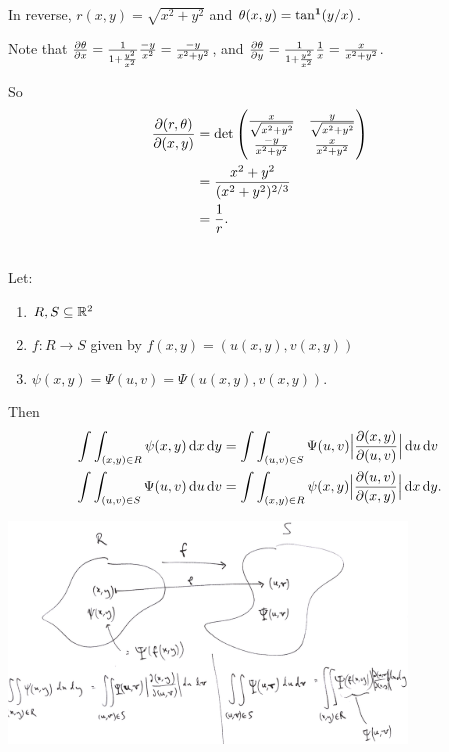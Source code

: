 \begin{example*}
  In reverse, $r(x,y) = \sqrt{x^2 + y^2}$ and $\theta(x,y) = \tan^{\mathbf 1}(y/x)$.

  Note that $\frac{\partial \theta}{\partial x} = \frac{1}{1 + \frac{y^2}{x^2}}\frac{-y}{x^2} = \frac{-y}{x^2 + y^2}$,
  and $\frac{\partial \theta}{\partial y} = \frac{1}{1 + \frac{y^2}{x^2}}\frac{1}{x} = \frac{x}{x^2 + y^2}$.

  So
  \begin{align*}
    \frac{\partial(r, \theta)}{\partial(x, y)}
    &= \det \begin{pmatrix}\frac{x}{\sqrt{x^2 + y^2}} & \frac{y}{\sqrt{x^2 + y^2}}\\\frac{-y}{x^2 + y^2}       & \frac{x}{x^2 + y^2}\\ \end{pmatrix}\\
    &= \frac{x^2 + y^2}{(x^2+y^2)^{2/3}}\\
    &= \frac{1}{r}.
  \end{align*}
\end{example*}

\begin{theorem*}~\\
  Let:
  \begin{enumerate}
  \item $R, S \subseteq \mathbb{R}^2$
  \item $f:R \to S$ given by $f(x,y) = (u(x,y), v(x,y))$
  \item $\psi(x, y) = \Psi(u, v) = \Psi(u(x,y), v(x, y))$.
  \end{enumerate}
  Then
  \begin{align*}
    \int\int_{(x,y) \in R} \psi(x,y)\dx \dy
    &= \int\int_{(u, v) \in S} \Psi(u, v)\Big|\frac{\partial(x, y)}{\partial(u, v)}\Big|\du \dv\\
    \int\int_{(u,v) \in S} \Psi(u,v)\du \dv
    &= \int\int_{(x, y) \in R} \psi(x, y)\Big|\frac{\partial(u, v)}{\partial(x, y)}\Big|\dx \dy.
  \end{align*}
\end{theorem*}

\begin{mdframed}
\includegraphics[width=300pt]{img/calculus-jacobian-2D-map.png}
\end{mdframed}

